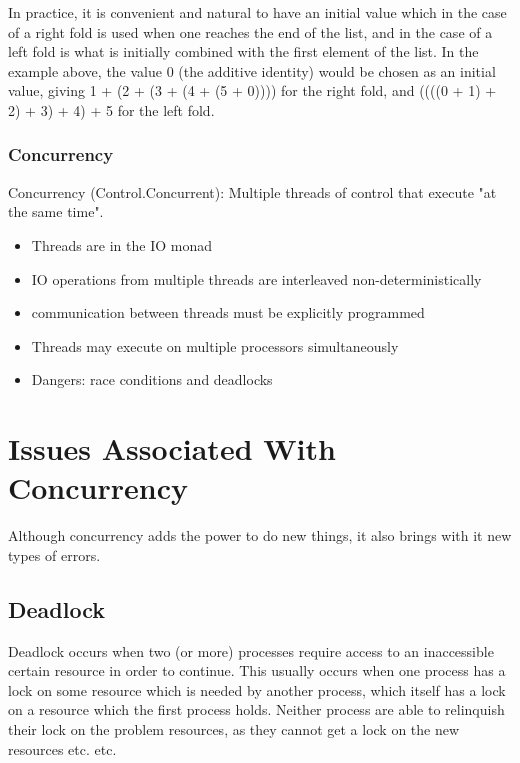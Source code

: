 \documentclass[a4paper,oneside]{report}
\begin{document}
			 In practice, it is convenient and natural to have an initial value which in the case of a right fold is used when one reaches the end of the list, and in the case of a left fold is what is initially combined with the first element of the list. In the example above, the value 0 (the additive identity) would be chosen as an initial value, giving 1 + (2 + (3 + (4 + (5 + 0)))) for the right fold, and ((((0 + 1) + 2) + 3) + 4) + 5 for the left fold.
			


      		\subsubsection{Concurrency}
			Concurrency (Control.Concurrent): Multiple threads of control that execute "at the same time".

				\begin{itemize}
					\item Threads are in the IO monad
					\item IO operations from multiple threads are interleaved non-deterministically
					\item communication between threads must be explicitly programmed
					\item Threads may execute on multiple processors simultaneously
					\item Dangers: race conditions and deadlocks
				\end{itemize}

    	
  	\section{Issues Associated With Concurrency}
  	
  	Although concurrency adds the power to do new things, it also brings with it new types of errors.
  	
    	\subsection{Deadlock}
    	Deadlock occurs when two (or more) processes require access to an inaccessible certain resource in order to continue. This usually occurs when one process has a lock on some resource which is needed by another process, which itself has a lock on a resource which the first process holds. Neither process are   able to relinquish their lock on the problem resources, as they cannot get a lock on the new resources etc. etc.\\
    	
\end{document}
